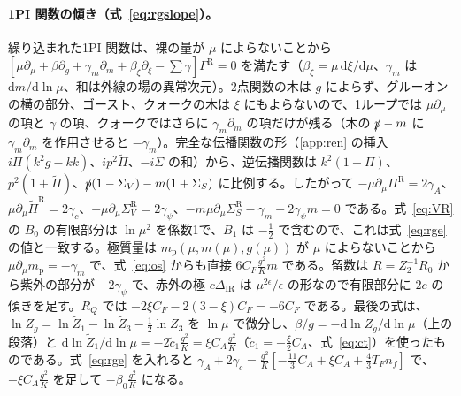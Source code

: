 \documentclass[a4paper,10pt]{ltjsarticle}
\newcommand{\dd}{\mathrm{d}}
\newcommand{\DIR}{\Delta_{\mathrm{IR}}}
\begin{document}
\paragraph{1PI 関数の傾き（式~\eqref{eq:rgslope}）。}繰り込まれた1PI 関数は、裸の量が $\mu$ によらないことから $[\mu\partial_\mu+\beta\partial_g+\gamma_m\partial_m+\beta_\xi\partial_\xi-\sum\gamma]\Gamma^{\mathrm R}=0$ を満たす（$\beta_\xi=\mu\,\dd\xi/\dd\mu$、$\gamma_m$ は $\dd m/\dd\ln\mu$、和は外線の場の異常次元）。2点関数の木は $g$ によらず、グルーオンの横の部分、ゴースト、クォークの木は $\xi$ にもよらないので、1ループでは $\mu\partial_\mu$ の項と $\gamma$ の項、クォークではさらに $\gamma_m\partial_m$ の項だけが残る（木の $\slashed p-m$ に $\gamma_m\partial_m$ を作用させると $-\gamma_m$）。完全な伝播関数の形（\ref{app:ren} の挿入 $i\Pi(k^2g-kk)$、$ip^2\tilde\Pi$、$-i\Sigma$ の和）から、逆伝播関数は $k^2(1-\Pi)$、$p^2(1+\tilde\Pi)$、$\slashed p(1-\Sigma_V)-m(1+\Sigma_S)$ に比例する。したがって $-\mu\partial_\mu\Pi^{\mathrm R}=2\gamma_A$、$\mu\partial_\mu\tilde\Pi^{\mathrm R}=2\gamma_c$、$-\mu\partial_\mu\Sigma_V^{\mathrm R}=2\gamma_\psi$、$-m\mu\partial_\mu\Sigma_S^{\mathrm R}-\gamma_m+2\gamma_\psi m=0$ である。式~\eqref{eq:VR} の $B_0$ の有限部分は $\ln\mu^2$ を係数1で、$B_1$ は $-\frac12$ で含むので、これは式~\eqref{eq:rge} の値と一致する。極質量は $m_{\mathrm p}(\mu,m(\mu),g(\mu))$ が $\mu$ によらないことから $\mu\partial_\mu m_{\mathrm p}=-\gamma_m$ で、式~\eqref{eq:os} からも直接 $6C_F\frac{g^2}Km$ である。留数は $R=Z_2^{-1}R_0$ から紫外の部分が $-2\gamma_\psi$ で、赤外の極 $c\DIR$ は $\mu^{2\epsilon}/\epsilon$ の形なので有限部分に $2c$ の傾きを足す。$R_Q$ では $-2\xi C_F-2(3-\xi)C_F=-6C_F$ である。最後の式は、$\ln Z_g=\ln\tilde Z_1-\ln\tilde Z_3-\frac12\ln Z_3$ を $\ln\mu$ で微分し、$\beta/g=-\dd\ln Z_g/\dd\ln\mu$（上の段落）と $\dd\ln\tilde Z_1/\dd\ln\mu=-2\tilde c_1\frac{g^2}K=\xi C_A\frac{g^2}K$（$\tilde c_1=-\frac\xi2C_A$、式~\eqref{eq:ct}）を使ったものである。式~\eqref{eq:rge} を入れると $\gamma_A+2\gamma_c=\frac{g^2}K[-\frac{11}3C_A+\xi C_A+\frac43T_Fn_f]$ で、$-\xi C_A\frac{g^2}K$ を足して $-\beta_0\frac{g^2}K$ になる。
\end{document}
